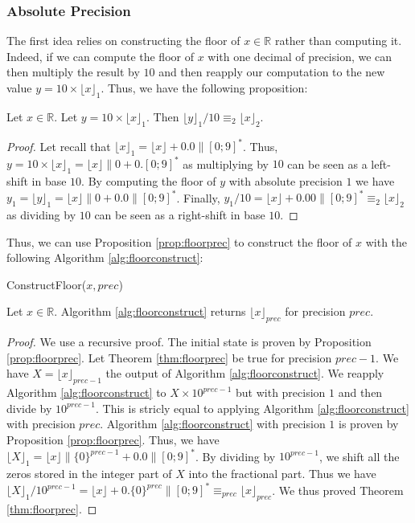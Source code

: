 \documentclass[runningheads]{llncs}
\begin{document}
\subsubsection{Absolute Precision} 
The first idea relies on constructing the floor of $x\in\mathbb{R}$ rather than computing it. Indeed, if we can compute the floor of $x$ with one decimal of precision, we can then multiply the result by $10$ and then reapply our computation to the new value $y=10\times \lfloor x\rfloor_1$. Thus, we have the following proposition:
\begin{proposition}\label{prop:floorprec}
  Let $x\in\mathbb{R}$. Let $y = 10\times\lfloor x\rfloor_1$. Then $\lfloor y \rfloor_1 /10 \equiv_2 \lfloor x \rfloor_2$.
\end{proposition}
\begin{proof}
  Let recall that $\lfloor x \rfloor_1 = \lfloor x \rfloor + 0.0 \|[0;9]^*$. Thus, $y=10\times\lfloor x \rfloor_1=\lfloor x\rfloor\|0+0.[0;9]^*$ as multiplying by $10$ can be seen as a left-shift in base $10$. By computing the floor of $y$ with absolute precision $1$ we have $y_1=\lfloor y \rfloor_1 = \lfloor x \rfloor\|0 + 0.0\|[0;9]^*$. Finally, $ y_1/10 = \lfloor x \rfloor + 0.00\|[0;9]^*\equiv_2 \lfloor x \rfloor_2$ as dividing by $10$ can be seen as a right-shift in base $10$.  
\end{proof}
Thus, we can use Proposition \ref{prop:floorprec} to construct the floor of $x$ with the following Algorithm \ref{alg:floorconstruct}:

\begin{algorithm}[H]
  \caption{ConstructFloor($x,prec$)}
  \label{alg:floorconstruct}
\end{algorithm}

\begin{theorem}\label{thm:floorprec}
  Let $x\in\mathbb{R}$. Algorithm \ref{alg:floorconstruct} returns $\lfloor x \rfloor_{prec}$ for precision $prec$.
\end{theorem}
\begin{proof}
  We use a recursive proof. The initial state is proven by Proposition \ref{prop:floorprec}. Let Theorem \ref{thm:floorprec} be true for precision $prec-1$. We have $X=\lfloor x \rfloor_{prec-1}$ the output of Algorithm \ref{alg:floorconstruct}. We reapply Algorithm \ref{alg:floorconstruct} to $X\times 10^{prec-1}$ but with precision $1$ and then divide by $10^{prec-1}$. This is stricly equal to applying Algorithm \ref{alg:floorconstruct} with precision $prec$. Algorithm \ref{alg:floorconstruct} with precision $1$ is proven by Proposition \ref{prop:floorprec}. Thus, we have $\lfloor X \rfloor_1 = \lfloor x\rfloor \| \{0\}^{prec-1} + 0.0\|[0;9]^*$. By dividing by $10^{prec-1}$, we shift all the zeros stored in the integer part of $X$ into the fractional part. Thus we have $\lfloor X \rfloor_1 /10^{prec-1} = \lfloor x \rfloor + 0.\{0\}^{prec}\|[0;9]^* \equiv_{prec} \lfloor x \rfloor_{prec}$. We thus proved Theorem \ref{thm:floorprec}.
\end{proof}
\end{document}
